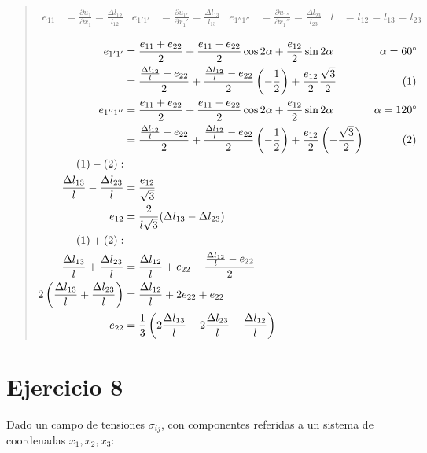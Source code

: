 \documentclass[a4paper,10pt,twoside,final,spanish]{article}
\begin{document}
\dotfill

\begin{quote}

\begin{align*}
e_{11} &= \frac{\partial u_{1}}{\partial x_{1}}=\frac{\Delta l_{12}}{l_{12}} &
e_{1'1'} &= \frac{\partial u_{1'}}{\partial x_{1}'}=\frac{\Delta l_{13}}{l_{13}} &
e_{1''1''} &= \frac{\partial u_{1''}}{\partial x_{1}''}=\frac{\Delta l_{23}}{l_{23}} &
l &= l_{12}=l_{13}=l_{23}
\end{align*}

\begin{align*}
e_{1'1'} &= \frac{e_{11}+e_{22}}{2}
+\frac{e_{11}-e_{22}}{2}\cos{2\alpha}
+\frac{e_{12}}{2}\sin{2\alpha} & \alpha=60\degree \\
&=\frac{\frac{\Delta l_{12}}{l}+e_{22}}{2}
+\frac{\frac{\Delta l_{12}}{l}-e_{22}}{2}\left(-\frac{1}{2}\right)
+\frac{e_{12}}{2}\frac{\sqrt{3}}{2} & (1) \\
e_{1''1''} &= \frac{e_{11}+e_{22}}{2}
+\frac{e_{11}-e_{22}}{2}\cos{2\alpha}
+\frac{e_{12}}{2}\sin{2\alpha} & \alpha=120\degree \\
&=\frac{\frac{\Delta l_{12}}{l}+e_{22}}{2}
+\frac{\frac{\Delta l_{12}}{l}-e_{22}}{2}\left(-\frac{1}{2}\right)
+\frac{e_{12}}{2}\left(-\frac{\sqrt{3}}{2}\right) & (2) \\
(1)-(2): & \\
\frac{\Delta l_{13}}{l}-\frac{\Delta l_{23}}{l} &= \frac{e_{12}}{\sqrt{3}} & \\
e_{12} &= \frac{2}{l\sqrt{3}}(\Delta l_{13}-\Delta l_{23}) & \\
(1)+(2): & \\
\frac{\Delta l_{13}}{l}+\frac{\Delta l_{23}}{l}
&=
\frac{\Delta l_{12}}{l}+e_{22}-\frac{\frac{\Delta l_{12}}{l}-e_{22}}{2} & \\
2\left(\frac{\Delta l_{13}}{l}+\frac{\Delta l_{23}}{l}\right)
&=
\frac{\Delta l_{12}}{l}+2e_{22}+e_{22} & \\
e_{22}
&=
\frac{1}{3}\left(
2\frac{\Delta l_{13}}{l}+2\frac{\Delta l_{23}}{l}-\frac{\Delta l_{12}}{l}
\right) & 
\end{align*}

\end{quote}

\section*{Ejercicio 8}

Dado un campo de tensiones $\sigma_{ij}$, con componentes referidas a un sistema de coordenadas $x_{1},x_{2},x_{3}$:
\end{document}
